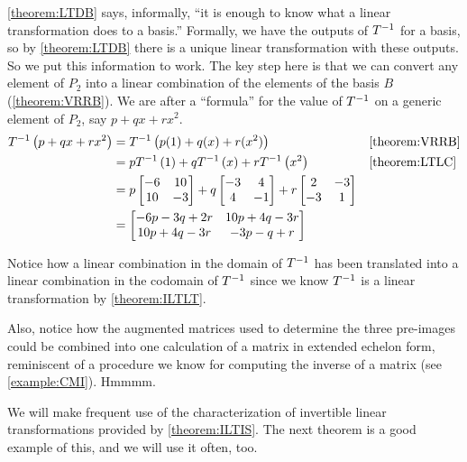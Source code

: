 \documentclass{ximera}
\begin{document}
\begin{example}
\ref{theorem:LTDB} says, informally, ``it is enough to know what a linear transformation does to a basis.''  Formally, we have the outputs of $T^{-1}$ for a basis, so by \ref{theorem:LTDB} there is a unique linear transformation with these outputs.  So we put this information to work.  The key step here is that we can convert any element of $P_2$ into a linear combination of the elements of the basis $B$ (\ref{theorem:VRRB}).  We are after a ``formula'' for the value of $T^{-1}$ on a generic element of $P_2$, say $p+qx+rx^2$.
\begin{align*}
T^{-1}\left(p+qx+rx^2\right)
&=
T^{-1}\left(p(1)+q(x)+r(x^2)\right)
&&\ref{theorem:VRRB}\\
&=
pT^{-1}\left(1\right)+
qT^{-1}\left(x\right)+
rT^{-1}\left(x^2\right)
&&\ref{theorem:LTLC}\\
&=
p\begin{bmatrix}-6&10\\10&-3\end{bmatrix}+
q\begin{bmatrix}-3&4\\4&-1\end{bmatrix}+
r\begin{bmatrix}2&-3\\-3&1\end{bmatrix}\\
&=
\begin{bmatrix}
-6p-3q+2r & 10p+4q-3r \\
10p+4q-3r & -3p -q + r
\end{bmatrix}
\end{align*}




Notice how a linear combination in the domain of $T^{-1}$ has been translated into a linear combination in the codomain of $T^{-1}$ since we know $T^{-1}$ is a linear transformation by \ref{theorem:ILTLT}.



Also, notice how the augmented matrices used to determine the three pre-images could be combined into one calculation of a matrix in extended echelon form, reminiscent of a procedure we know for computing the inverse of a matrix (see \ref{example:CMI}).  Hmmmm.



\end{example}

We will make frequent use of the characterization of invertible linear transformations provided by \ref{theorem:ILTIS}.  The next theorem is a good example of this, and we will use it often, too.
\end{document}
